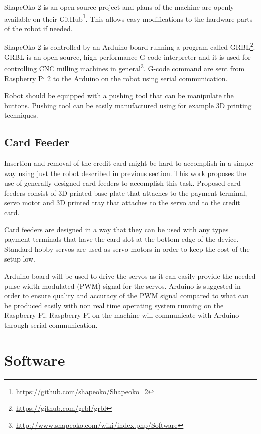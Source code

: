 ShapeOko 2 is an open-source project and plans of the machine are openly available on their GitHub\footnote{\url{https://github.com/shapeoko/Shapeoko_2}}. This allows easy modifications to the hardware parts of the robot if needed.

ShapeOko 2 is controlled by an Arduino board running a program called GRBL\footnote{\url{https://github.com/grbl/grbl}}. GRBL is an open source, high performance G-code interpreter and it is used for controlling CNC milling machines in general\footnote{\url{http://www.shapeoko.com/wiki/index.php/Software}}. G-code command are sent from Raspberry Pi 2 to the Arduino on the robot using serial communication.

Robot should be equipped with a pushing tool that can be manipulate the buttons. Pushing tool can be easily manufactured using for example 3D printing techniques.

\FloatBarrier
\subsection{Card Feeder}
\label{subsection:Card feeder}

Insertion and removal of the credit card might be hard to accomplish in a simple way using just the robot described in previous section. This work proposes the use of generally designed card feeders to accomplish this task. Proposed card feeders consist of 3D printed base plate that attaches to the payment terminal, servo motor and 3D printed tray that attaches to the servo and to the credit card.

Card feeders are designed in a way that they can be used with any types payment terminals that have the card slot at the bottom edge of the device. Standard hobby servos are used as servo motors in order to keep the cost of the setup low.

Arduino board will be used to drive the servos as it can easily provide the needed pulse width modulated (PWM) signal for the servos. Arduino is suggested in order to ensure quality and accuracy of the PWM signal compared to what can be produced easily with non real time operating system running on the Raspberry Pi. Raspberry Pi on the machine will communicate with Arduino through serial communication.

\section{Software}
\label{section:software}

